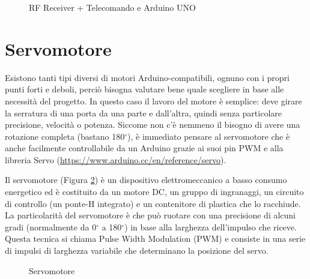\documentclass[12pt]{report}
\begin{document}
\begin{figure}
	\caption{RF Receiver + Telecomando e Arduino UNO}
	\label{fig:rf_uno}
\end{figure}

\pagebreak

%
\section{Servomotore}\label{sec:servomotore}
%

Esistono tanti tipi diversi di motori Arduino-compatibili, ognuno con i propri punti forti e deboli, perciò bisogna valutare bene quale scegliere in base alle necessità del progetto. In questo caso il lavoro del motore è semplice: deve girare la serratura di una porta da una parte e dall'altra, quindi senza particolare precisione, velocità o potenza. Siccome non c'è nemmeno il bisogno di avere una rotazione completa (bastano 180$^{\circ}$), è immediato pensare al servomotore che è anche facilmente controllabile da un Arduino grazie ai suoi pin PWM e alla libreria Servo (\url{https://www.arduino.cc/en/reference/servo}).

Il servomotore (Figura \ref{fig:servo}) è un dispositivo elettromeccanico a basso consumo energetico ed è costituito da un motore DC, un gruppo di ingranaggi, un circuito di controllo (un ponte-H integrato) e un contenitore di plastica che lo racchiude.
La particolarità del servomotore è che può ruotare con una precisione di alcuni gradi (normalmente da 0$^{\circ}$ a 180$^{\circ}$) in base alla larghezza dell'impulso che riceve. Questa tecnica si chiama Pulse Width Modulation (PWM) e consiste in una serie di impulsi di larghezza variabile che determinano la posizione del servo.

\begin{figure}
	\caption{Servomotore}
	\label{fig:servo}
\end{figure}
\end{document}
